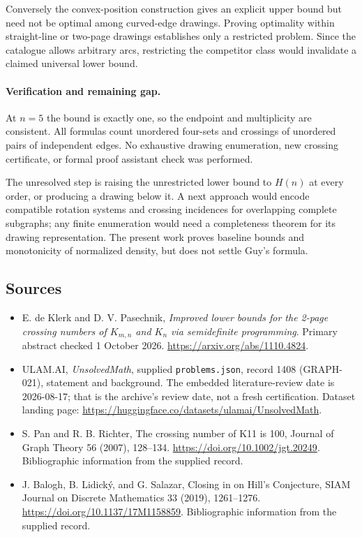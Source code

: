 \documentclass[11pt,a4paper]{article}
\begin{document}
Conversely the convex-position construction gives an explicit upper bound but need not be optimal among curved-edge drawings. Proving optimality within straight-line or two-page drawings establishes only a restricted problem. Since the catalogue allows arbitrary arcs, restricting the competitor class would invalidate a claimed universal lower bound.

\paragraph{Verification and remaining gap.}
At $n=5$ the bound is exactly one, so the endpoint and multiplicity are consistent. All formulas count unordered four-sets and crossings of unordered pairs of independent edges. No exhaustive drawing enumeration, new crossing certificate, or formal proof assistant check was performed.

The unresolved step is raising the unrestricted lower bound to $H(n)$ at every order, or producing a drawing below it. A next approach would encode compatible rotation systems and crossing incidences for overlapping complete subgraphs; any finite enumeration would need a completeness theorem for its drawing representation. The present work proves baseline bounds and monotonicity of normalized density, but does not settle Guy's formula.

\subsection{Sources}

{\small

\begin{itemize}
\item[E1] E. de Klerk and D. V. Pasechnik, \emph{Improved lower bounds for the 2-page crossing numbers of $K_{m,n}$ and $K_n$ via semidefinite programming}. Primary abstract checked 1 October 2026. \url{https://arxiv.org/abs/1110.4824}.


\item[\hypertarget{source:1408:1}{S1}] ULAM.AI, \emph{UnsolvedMath}, supplied \texttt{problems.json}, record 1408 (GRAPH-021), statement and background. The embedded literature-review date is 2026-08-17; that is the archive’s review date, not a fresh certification. Dataset landing page: \url{https://huggingface.co/datasets/ulamai/UnsolvedMath}.

\item[\hypertarget{source:1408:2}{S2}] S. Pan and R. B. Richter, The crossing number of K11 is 100, Journal of Graph Theory 56 (2007), 128–134. \url{https://doi.org/10.1002/jgt.20249}. Bibliographic information from the supplied record.

\item[\hypertarget{source:1408:3}{S3}] J. Balogh, B. Lidický, and G. Salazar, Closing in on Hill's Conjecture, SIAM Journal on Discrete Mathematics 33 (2019), 1261–1276. \url{https://doi.org/10.1137/17M1158859}. Bibliographic information from the supplied record.

\end{itemize}

}

\label{end:1408}
\end{document}
